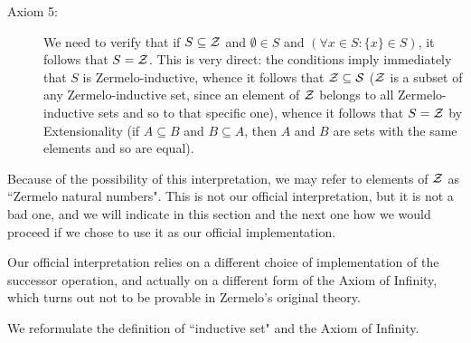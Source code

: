 \documentclass[12pt]{book}
\begin{document}
\begin{description}
\begin{description}
\item[Axiom 5:]  We need to verify that if $S \subseteq \cal Z$ and $\emptyset \in S$ and $(\forall x\in S:\{x\} \in S)$, it follows that $S=\cal Z$.  This is very direct:  the conditions imply immediately that $S$ is Zermelo-inductive, whence it follows that $\cal Z \subseteq S$  ($\cal Z$ is a subset of any Zermelo-inductive set, since an element of $\cal Z$ belongs to all Zermelo-inductive sets and so to that specific one), whence it follows that $S = \cal Z$ by Extensionality (if $A \subseteq B$ and $B \subseteq A$, then $A$ and $B$ are sets with the same elements and so are equal).

\end{description}

\end{description}

Because of the possibility of this interpretation, we may refer to elements of $\cal Z$ as ``Zermelo natural numbers".  This is not our official interpretation, but it is not a bad one, and we will indicate in this section and the next one how we would proceed if we chose to use it as our official implementation.

Our official interpretation relies on a different choice of implementation of the successor operation, and actually on a different form of the Axiom of Infinity, which turns out not to be provable in Zermelo's original theory.

We reformulate the definition of ``inductive set" and the Axiom of Infinity.
\end{document}
